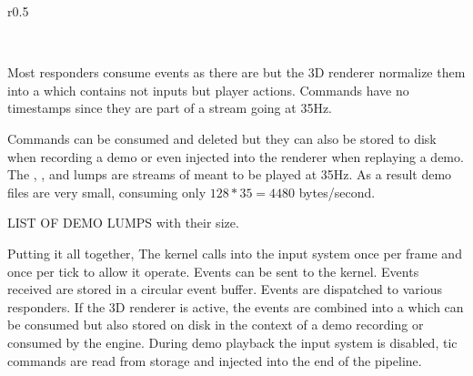 \begin{wrapfigure}[11]{r}{0.5\textwidth}
\centering
{}
\end{wrapfigure}
\\
\par
Most responders consume events as there are but the 3D renderer normalize them into a  which contains not inputs but player actions. Commands have no timestamps since they are part of a stream going at 35Hz. \\
\par
{}
\par
Commands can be consumed and deleted but they can also be stored to disk when recording a demo or even injected into the renderer when replaying a demo. The , , and  lumps are streams of  meant to be played at 35Hz. As a result demo files are very small, consuming only $ 128 * 35 = 4480 $ bytes/second.\\
\par
LIST OF DEMO LUMPS with their size.
\par

\par
Putting it all together,  The kernel calls into the input system once per frame and once per tick to allow it operate.  Events can be sent to the kernel.  Events received are stored in a circular event buffer.  Events are dispatched to various responders. If the 3D renderer is active, the events are combined into a  which can be consumed but also stored on disk in the context of a demo recording or consumed by the engine. During demo playback the input system is disabled, tic commands are read from storage and injected into the end of the pipeline.
\par